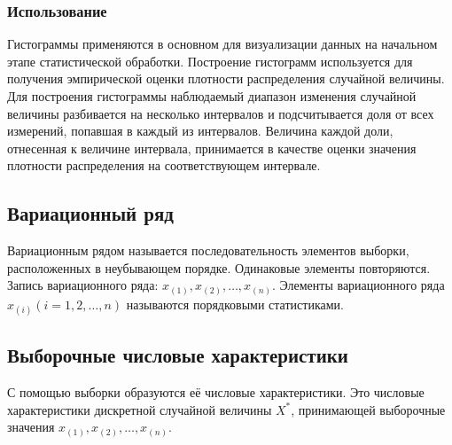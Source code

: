 \documentclass[main.tex]{subfiles}
\begin{document}
	\subsubsection{Использование}
	\noindent Гистограммы применяются в основном для визуализации данных на начальном этапе статистической обработки. \newline Построение гистограмм используется для получения эмпирической оценки плотности распределения случайной величины. Для построения гистограммы наблюдаемый диапазон изменения случайной величины разбивается на несколько интервалов и подсчитывается доля от всех измерений, попавшая в каждый из интервалов. Величина каждой доли, отнесенная к величине интервала, принимается в качестве оценки значения плотности распределения на соответствующем интервале.
	
    \subsection{Вариационный ряд}
	\noindent Вариационным рядом называется последовательность элементов выборки, расположенных в неубывающем порядке. Одинаковые элементы повторяются.
	Запись вариационного ряда: $x_{(1)}, x_{(2)}, \ldots, x_{(n)}$.
	Элементы вариационного ряда $x_{(i)} (i = 1, 2, \ldots, n)$ называются порядковыми статистиками.
	
	\subsection{Выборочные числовые характеристики}
	\noindent С помощью выборки образуются её числовые характеристики. Это числовые характеристики дискретной случайной величины $X^{*}$, принимающей выборочные значения $x_{(1)}, x_{(2)}, \ldots, x_{(n)}$.
	
\end{document}
